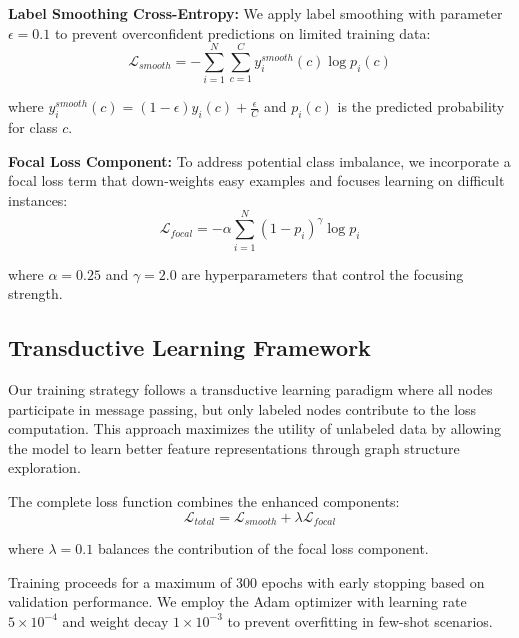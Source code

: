 \textbf{Label Smoothing Cross-Entropy:} We apply label smoothing with parameter $\epsilon = 0.1$ to prevent overconfident predictions on limited training data:
\begin{equation}
\mathcal{L}_{smooth} = -\sum_{i=1}^{N} \sum_{c=1}^{C} y_i^{smooth}(c) \log p_i(c)
\end{equation}

where $y_i^{smooth}(c) = (1-\epsilon)y_i(c) + \frac{\epsilon}{C}$ and $p_i(c)$ is the predicted probability for class $c$.

\textbf{Focal Loss Component:} To address potential class imbalance, we incorporate a focal loss term that down-weights easy examples and focuses learning on difficult instances:
\begin{equation}
\mathcal{L}_{focal} = -\alpha \sum_{i=1}^{N} (1-p_i)^{\gamma} \log p_i
\end{equation}

where $\alpha = 0.25$ and $\gamma = 2.0$ are hyperparameters that control the focusing strength.

\subsection{Transductive Learning Framework}

Our training strategy follows a transductive learning paradigm where all nodes participate in message passing, but only labeled nodes contribute to the loss computation. This approach maximizes the utility of unlabeled data by allowing the model to learn better feature representations through graph structure exploration.

The complete loss function combines the enhanced components:
\begin{equation}
\mathcal{L}_{total} = \mathcal{L}_{smooth} + \lambda \mathcal{L}_{focal}
\end{equation}

where $\lambda = 0.1$ balances the contribution of the focal loss component.

Training proceeds for a maximum of 300 epochs with early stopping based on validation performance. We employ the Adam optimizer with learning rate $5 \times 10^{-4}$ and weight decay $1 \times 10^{-3}$ to prevent overfitting in few-shot scenarios.

\EndChapter
